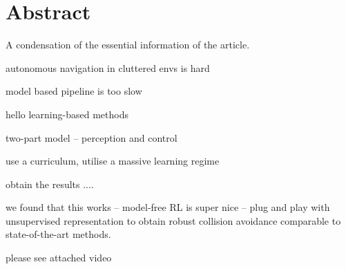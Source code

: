 \chapter*{Abstract}

A condensation of the essential information of the article.

autonomous navigation in cluttered envs is hard

model based pipeline is too slow

hello learning-based methods

two-part model -- perception and control

use a curriculum,
utilise a massive learning regime

obtain the results ....

we found that this works -- model-free RL is super nice -- plug and play with unsupervised representation to obtain robust collision avoidance comparable to state-of-the-art methods.

please see attached video